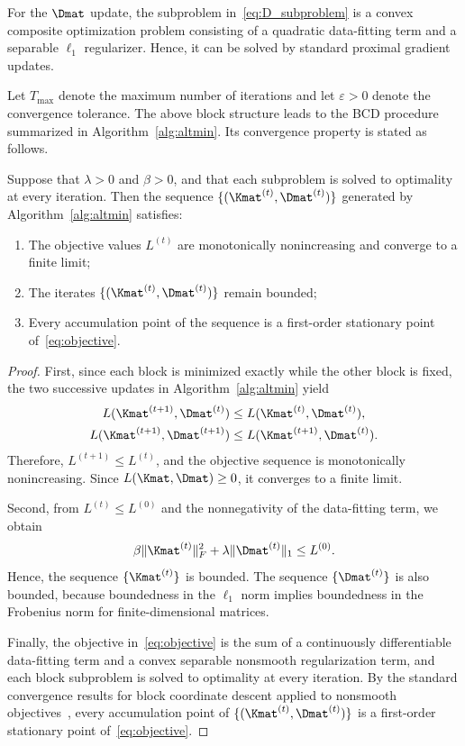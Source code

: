 For the $\Dmat$ update, the subproblem in~\eqref{eq:D_subproblem} is a convex composite optimization problem consisting of a quadratic data-fitting term and a separable $\ell_1$ regularizer. Hence, it can be solved by standard proximal gradient updates.

Let $T_{\max}$ denote the maximum number of iterations and let $\varepsilon>0$ denote the convergence tolerance. The above block structure leads to the BCD procedure summarized in Algorithm~\ref{alg:altmin}. Its convergence property is stated as follows.

\begin{theorem}
\label{thm:altmin_convergence}
Suppose that $\lambda>0$ and $\beta>0$, and that each subproblem is solved to optimality at every iteration. Then the sequence $\{(\Kmat^{(t)}, \Dmat^{(t)})\}$ generated by Algorithm~\ref{alg:altmin} satisfies:
\begin{enumerate}
\item The objective values $L^{(t)}$ are monotonically nonincreasing and converge to a finite limit;
\item The iterates $\{(\Kmat^{(t)},\Dmat^{(t)})\}$ remain bounded;
\item Every accumulation point of the sequence is a first-order stationary point of~\eqref{eq:objective}.
\end{enumerate}
\end{theorem}

\begin{proof}
First, since each block is minimized exactly while the other block is fixed, the two successive updates in Algorithm~\ref{alg:altmin} yield
\[
\begin{aligned}
L(\Kmat^{(t+1)},\Dmat^{(t)}) &\le L(\Kmat^{(t)},\Dmat^{(t)}), \\
L(\Kmat^{(t+1)},\Dmat^{(t+1)}) &\le L(\Kmat^{(t+1)},\Dmat^{(t)}).
\end{aligned}
\]
Therefore, $L^{(t+1)} \le L^{(t)}$, and the objective sequence is monotonically nonincreasing. Since $L(\Kmat,\Dmat) \ge 0$, it converges to a finite limit.

Second, from $L^{(t)} \le L^{(0)}$ and the nonnegativity of the data-fitting term, we obtain
\[
\beta\|\Kmat^{(t)}\|_F^2 + \lambda\|\Dmat^{(t)}\|_1 \le L^{(0)}.
\]
Hence, the sequence $\{\Kmat^{(t)}\}$ is bounded. The sequence $\{\Dmat^{(t)}\}$ is also bounded, because boundedness in the $\ell_1$ norm implies boundedness in the Frobenius norm for finite-dimensional matrices.

Finally, the objective in~\eqref{eq:objective} is the sum of a continuously differentiable data-fitting term and a convex separable nonsmooth regularization term, and each block subproblem is solved to optimality at every iteration. By the standard convergence results for block coordinate descent applied to nonsmooth objectives~\cite{Tseng2001}, every accumulation point of $\{(\Kmat^{(t)},\Dmat^{(t)})\}$ is a first-order stationary point of~\eqref{eq:objective}.
\end{proof}

